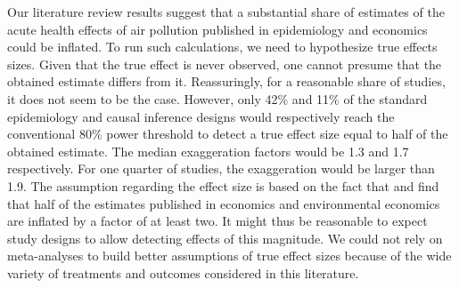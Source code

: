 \documentclass[12pt]{article}
\begin{document}
    Our literature review results suggest that a substantial share of estimates of the acute health effects of air pollution published in epidemiology and economics could be inflated. To run such calculations, we need to hypothesize true effects sizes. Given that the true effect is never observed, one cannot presume that the obtained estimate differs from it. Reassuringly, for a reasonable share of studies, it does not seem to be the case. 
    However, only 42\% and 11\% of the standard epidemiology and causal inference designs would respectively reach the conventional 80\% power threshold to detect a true effect size equal to half of the obtained estimate. The median exaggeration factors would be 1.3 and 1.7 respectively. For one quarter of studies, the exaggeration would be larger than 1.9. The assumption regarding the effect size is based on the fact that \cite{ioannidis_power_2017} and \cite{ferraro_featureis_2020} find that half of the estimates published in economics and environmental economics are inflated by a factor of at least two. It might thus be reasonable to expect study designs to allow detecting effects of this magnitude. We could not rely on meta-analyses to build better assumptions of true effect sizes because of the wide variety of treatments and outcomes considered in this literature.
\end{document}
